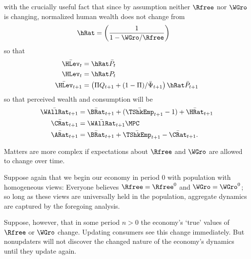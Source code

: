 \documentclass{handout}
\begin{document}
with the crucially useful fact that since by assumption neither $\Rfree$ nor $\WGro$ is 
changing, normalized human wealth does not change from
\begin{equation}\begin{gathered}\begin{aligned}
  \hRat & =  \left(\frac{1}{1-\WGro/\Rfree}\right)
\end{aligned}\end{gathered}\end{equation}
so that 
\begin{equation}\begin{gathered}\begin{aligned}
  \bar{\HLev}_{t} & =  \hRat \bar{P}_{t}
\\ \HLev_{t} & =  \hRat P_{t}
\\ \bar{\HLev}_{t+1} & =  \left(\Pi Q_{t+1} + (1-\Pi)/\bar{\Psi}_{t+1} \right) \hRat \bar{P}_{t+1}
\end{aligned}\end{gathered}\end{equation}
so that perceived wealth and consumption will be
\begin{equation}\begin{gathered}\begin{aligned}
  \bar{\WAllRat}_{t+1} & =  \bar{\BRat}_{t+1}+(\bar{\TShkEmp}_{t+1}-1)+\bar{\HRat}_{t+1}
\\ \bar{\CRat}_{t+1} & =  \bar{\WAllRat}_{t+1} \MPC
\\ \bar{\ARat}_{t+1} & =  \bar{\BRat}_{t+1}+\bar{\TShkEmp}_{t+1}-\bar{\CRat}_{t+1}
.
\end{aligned}\end{gathered}\end{equation}

Matters are more complex if expectations about $\Rfree$ and $\WGro$ are allowed to change
over time.

Suppose again that we begin our economy in period $0$ with population with homogeneous views: Everyone believes $\Rfree=\Rfree^{0}$ and $\WGro=\WGro^{0}$; so long as these views are universally held in the population, aggregate dynamics are captured by the foregoing analysis.  

Suppose, however, that in some period $n>0$ the economy's `true' values of $\Rfree$ or $\WGro$ change.  
Updating consumers see this change immediately.  But nonupdaters will not discover the changed nature
of the economy's dynamics until they update again.  
\end{document}
